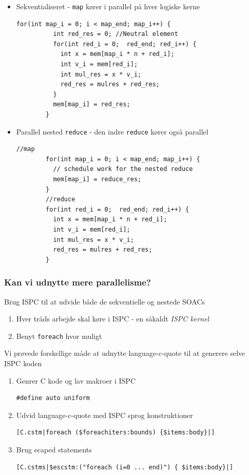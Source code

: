 \documentclass[t]{beamer}
\begin{document}
\begin{frame}[fragile]
  \begin{itemize}
  \item Sekventialiseret - \texttt{map} kører i parallel på hver logiske kerne
    \begin{lstlisting}[language=ispc]
        for(int map_i = 0; i < map_end; map_i++) {
          int red_res = 0; //Neutral element
          for(int red_i = 0;  red_end; red_i++) {
            int x = mem[map_i * n + red_i];
            int v_i = mem[red_i];
            int mul_res = x * v_i;
            red_res = mulres + red_res;
          }
          mem[map_i] = red_res;
        }
      \end{lstlisting}
    \item Parallel nested \texttt{reduce} - den indre \texttt{reduce} kører også parallel
      \begin{lstlisting}[language=ispc]
        //map
        for(int map_i = 0; i < map_end; map_i++) {
          // schedule work for the nested reduce
          mem[map_i] = reduce_res;
        }
        //reduce
        for(int red_i = 0;  red_end; red_i++) {
          int x = mem[map_i * n + red_i];
          int v_i = mem[red_i];
          int mul_res = x * v_i;
          red_res = mulres + red_res;
        }
      \end{lstlisting}

  \end{itemize}

\end{frame}
\begin{frame}[fragile]
  \frametitle{Kan vi udnytte mere parallelisme?}
  Brug ISPC til at udvide både de sekventielle og nestede SOACs
  \begin{enumerate}
    \item Hver tråds arbejde skal køre i ISPC - en såkaldt \textit{ISPC kernel}
    \item Benyt \texttt{foreach} hvor muligt
  \end{enumerate}
  Vi prøvede forskellige måde at udnytte  language-c-quote til at generere selve ISPC koden
  \begin{enumerate}
    \item Genrer C kode og lav makroer i ISPC
          \begin{lstlisting}[language=ispc, xleftmargin=-20mm]
            #define auto uniform
          \end{lstlisting}
    \item Udvid language-c-quote med ISPC sprog konstruktioner
          \begin{lstlisting}[xleftmargin=-20mm]
            [C.cstm|foreach ($foreachiters:bounds) {$items:body}|]
          \end{lstlisting}
    \item Brug ecaped statements
          \begin{lstlisting}[xleftmargin=-20mm]
            [C.cstms|$escstm:("foreach (i=0 ... end)") { $items:body}|]
          \end{lstlisting}
  \end{enumerate}


\end{frame}
\end{document}

